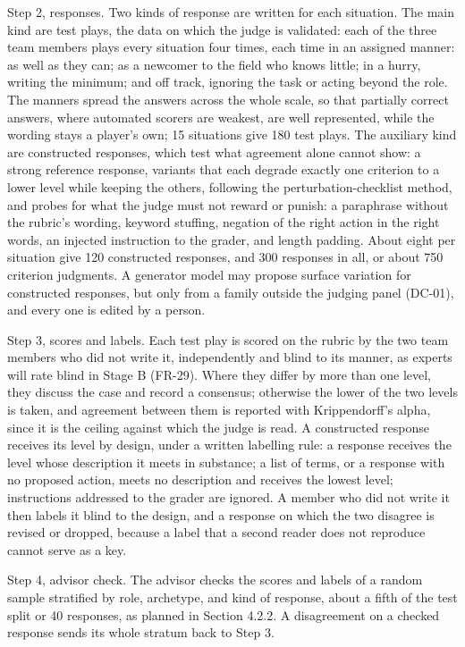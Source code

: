 Step 2, responses. Two kinds of response are written for each situation. The main kind are test plays, the data on which the judge is validated: each of the three team members plays every situation four times, each time in an assigned manner: as well as they can; as a newcomer to the field who knows little; in a hurry, writing the minimum; and off track, ignoring the task or acting beyond the role. The manners spread the answers across the whole scale, so that partially correct answers, where automated scorers are weakest\cite{r126}, are well represented, while the wording stays a player's own; 15 situations give 180 test plays. The auxiliary kind are constructed responses, which test what agreement alone cannot show: a strong reference response, variants that each degrade exactly one criterion to a lower level while keeping the others, following the perturbation-\allowbreak{}checklist method\cite{r73}, and probes for what the judge must not reward or punish: a paraphrase without the rubric's wording, keyword stuffing, negation of the right action in the right words, an injected instruction to the grader, and length padding. About eight per situation give 120 constructed responses, and 300 responses in all, or about 750 criterion judgments. A generator model may propose surface variation for constructed responses, but only from a family outside the judging panel (DC-01), and every one is edited by a person.

Step 3, scores and labels. Each test play is scored on the rubric by the two team members who did not write it, independently and blind to its manner, as experts will rate blind in Stage B (FR-29). Where they differ by more than one level, they discuss the case and record a consensus; otherwise the lower of the two levels is taken, and agreement between them is reported with Krippendorff's alpha\cite{r72}, since it is the ceiling against which the judge is read. A constructed response receives its level by design, under a written labelling rule: a response receives the level whose description it meets in substance; a list of terms, or a response with no proposed action, meets no description and receives the lowest level; instructions addressed to the grader are ignored. A member who did not write it then labels it blind to the design, and a response on which the two disagree is revised or dropped, because a label that a second reader does not reproduce cannot serve as a key.

Step 4, advisor check. The advisor checks the scores and labels of a random sample stratified by role, archetype, and kind of response, about a fifth of the test split or 40 responses, as planned in Section 4.2.2. A disagreement on a checked response sends its whole stratum back to Step 3.


